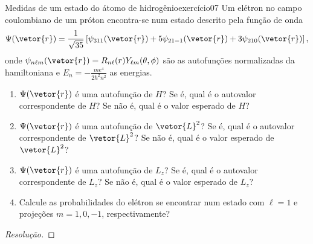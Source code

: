 \begin{exercício}{Medidas de um estado do átomo de hidrogênio}{exercício07}
    Um elétron no campo coulombiano de um próton encontra-se num estado descrito pela função de onda
    \begin{equation*}
        \Psi(\vetor{r}) = \frac1{\sqrt{35}}\left[\psi_{311}(\vetor{r}) + 5 \psi_{21-1}(\vetor{r}) + 3\psi_{210}(\vetor{r})\right],
    \end{equation*}
    onde \(\psi_{n\ell m}(\vetor{r}) = R_{n\ell}(r) Y_{\ell m}(\theta, \phi)\) são as autofunções normalizadas da hamiltoniana e \(E_n = - \frac{m e^4}{2\hbar^2 n^2}\) as energias.
    \begin{enumerate}[label=(\alph*)]
        \item \(\Psi(\vetor{r})\) é uma autofunção de \(H\)? Se é, qual é o autovalor correspondente de \(H\)? Se não é, qual é o valor esperado de \(H\)?
        \item \(\Psi(\vetor{r})\) é uma autofunção de \(\vetor{L}^2\)? Se é, qual é o autovalor correspondente de \(\vetor{L}^2\)? Se não é, qual é o valor esperado de \(\vetor{L}^2\)?
        \item \(\Psi(\vetor{r})\) é uma autofunção de \(L_z\)? Se é, qual é o autovalor correspondente de \(L_z\)? Se não é, qual é o valor esperado de \(L_z\)?
        \item Calcule as probabilidades do elétron se encontrar num estado com \(\ell = 1\) e projeções \(m = 1, 0, -1\), respectivamente?
    \end{enumerate}
\end{exercício}
\begin{proof}[Resolução]

\end{proof}

